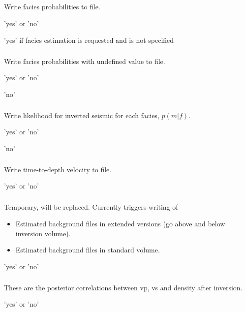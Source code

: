 \subparagraph{}
 \slist
   \item \Description Write facies probabilities to file.
   \item \Argument 'yes' or 'no'
   \item \Default 'yes' if facies estimation is requested and  is not specified
 \elist

\subparagraph{}
 \slist
   \item \Description Write facies probabilities with undefined value to file.
   \item \Argument 'yes' or 'no'
   \item \Default 'no'
 \elist

\subparagraph{}
 \slist
   \item \Description Write likelihood for inverted seismic for each
     facies, $p(m|f)$.
   \item \Argument 'yes' or 'no'
   \item \Default 'no'
 \elist

\subparagraph{}
 \slist
   \item \Description Write time-to-depth velocity to file.
   \item \Argument 'yes' or 'no'
   \item \Default
 \elist

\subparagraph{}
 \slist
   \item \Description Temporary, will be replaced. Currently triggers writing of
   \begin{itemize}
   \item Estimated background files in extended versions (go above and below inversion volume).
   \item Estimated background files in standard volume.
   \end{itemize}
   \item \Argument 'yes' or 'no'
   \item \Default
\elist

\subparagraph{}
 \slist
   \item \Description These are the posterior correlations between vp, vs and density after inversion.
   \item \Argument 'yes' or 'no'
   \item \Default
\elist

